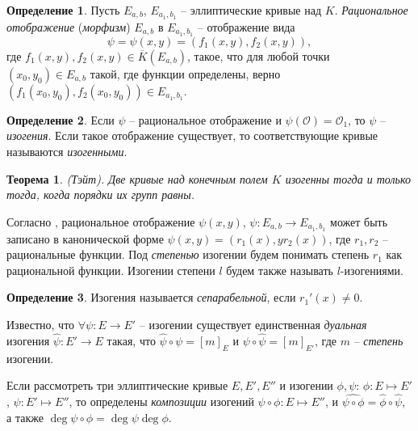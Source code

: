 \documentclass[a4paper,12pt]{article}
\newtheorem{theorem}{Теорема}
\theoremstyle{definition}
\newtheorem{definition}{Определение}
\begin{document}

\begin{definition}
Пусть $E_{a,b}$, $E_{a_1,b_1}$ -- эллиптические кривые над $K$. \emph{Рациональное отображение} (\emph{морфизм}) $E_{a,b}$ в $E_{a_1,b_1}$ -- отображение вида
$$
\psi=\psi(x,y)=(f_1(x,y),f_2(x,y)),
$$
где $f_1(x,y),f_2(x,y)\in\overline{K}(E_{a,b})$, такое, что для любой точки $(x_0,y_0)\in E_{a,b}$ такой, где функции определены,
верно $(f_1(x_0,y_0),f_2(x_0,y_0))\in E_{a_1,b_1}.$
\end{definition}


\begin{definition}
Если $\psi$ -- рациональное отображение и $\psi(\mathcal{O})=\mathcal{O}_1$, то $\psi$ -- \emph{изогения}.
Если такое отображение существует, то соответствующие кривые называются \emph{изогенными}.
\end{definition}

\begin{theorem} (Тэйт).
Две кривые над  конечным полем $K$ изогенны тогда и только тогда, когда порядки их групп равны.
\end{theorem}

Согласно \cite[2.9]{Wash}, рациональное отображение $\psi(x,y)$, $\psi:E_{a,b}\to E_{a_1,b_1}$ 
может быть записано в канонической форме $\psi(x,y)=(r_1(x),yr_2(x))$, где $r_1,r_2$ -- рациональные функции. Под \emph{степенью} изогении будем понимать степень $r_1$ как рациональной функции. Изогении степени $l$ будем также называть $l$-изогениями. 

\begin{definition}
Изогения называется \emph{сепарабельной}, если $r_1'(x)\neq 0$.
\end{definition}

Известно, что  $\forall \psi:E\to E'$ -- изогении  существует единственная \emph{дуальная} изогения $\hat{\psi}:E'\to E$ такая, что $\hat{\psi}\circ \psi=[m]_E$ и $\psi\circ\hat{\psi}=[m]_{E'}$, где $m$ -- \emph{степень} изогении.

Если рассмотреть три эллиптические кривые $E,E',E''$ и изогении $\phi,\psi$: $\phi:E\mapsto E'$, $\psi:E'\mapsto E''$,
то определены \emph{композиции} изогений $\psi\circ\phi:E\mapsto E''$, и $\widehat{\psi\circ\phi}=\hat{\phi}\circ\hat{\psi}$, а также $\deg \psi\circ\phi=\deg\psi \deg\phi$.
\end{document}
